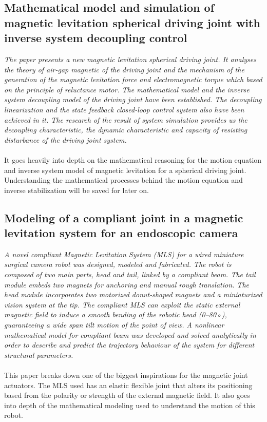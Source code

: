 \subsection{Mathematical model and simulation of magnetic levitation  spherical  driving  joint  with  inverse  system  decoupling  control \cite{yanneng2012mathematical}}

\textit{The paper presents a new magnetic levitation spherical driving joint. 
It analyses the theory of air-gap magnetic of the driving joint and the mechanism of the generation of the magnetic levitation force and electromagnetic torque which based on the principle of reluctance motor. 
The mathematical model and the inverse system decoupling model of the driving joint have been established. The decoupling linearization and the state feedback closed-loop control system also have been achieved in it. 
The research of the result of system simulation provides us the decoupling characteristic, the dynamic characteristic and capacity of resisting disturbance of the driving joint system.} \\ 
\\
It goes heavily into depth on the mathematical reasoning for the motion equation and inverse system model of magnetic levitation for a spherical driving joint. 
Understanding the mathematical processes behind the motion equation and inverse stabilization will be saved for later on.

\subsection{Modeling  of  a  compliant  joint  in  a  magnetic  levitation  system  for  an  endoscopic camera \cite{tolou2012modeling}}

\textit{A novel compliant Magnetic Levitation System (MLS) for a wired miniature surgical camera robot was designed, modeled and fabricated. 
The robot is composed of two main parts, head and tail, linked by a compliant beam. 
The tail module embeds two magnets for anchoring and manual rough translation. 
The head module incorporates two motorized donut-shaped magnets and a miniaturized vision system at the tip. The compliant MLS can exploit the static external magnetic field to induce a smooth bending of the robotic head (0–80◦), guaranteeing a wide span tilt motion of the point of view.
A nonlinear mathematical model for compliant beam was developed and solved analytically in order to describe and predict the trajectory behaviour of the system for different structural parameters.} \\
\\
This paper breaks down one of the biggest inspirations for the magnetic joint actuators. 
The MLS used has an elastic flexible joint that alters its positioning based from the polarity or strength of the external magnetic field.
It also goes into depth of the mathematical modeling used to understand the motion of this robot.

